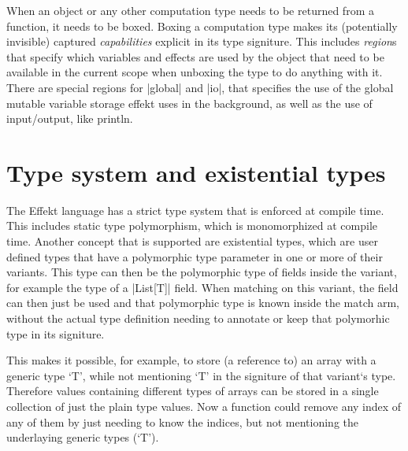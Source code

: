 When an object or any other computation type needs to be returned from a function, it needs to be boxed. Boxing a computation type makes its (potentially invisible) captured \textit{capabilities} explicit in its type signiture. This includes \textit{region}s that specify which variables and effects are used by the object that need to be available in the current scope when unboxing the type to do anything with it. There are special regions for |global| and |io|, that specifies the use of the global mutable variable storage effekt uses in the background, as well as the use of input/output, like println.

\section{Type system and existential types}

The Effekt language has a strict type system that is enforced at compile time. This includes static type polymorphism, which is monomorphized at compile time. Another concept that is supported are existential types, which are user defined types that have a polymorphic type parameter in one or more of their variants. This type can then be the polymorphic type of fields inside the variant, for example the type of a |List[T]| field. When matching on this variant, the field can then just be used and that polymorphic type is known inside the match arm, without the actual type definition needing to annotate or keep that polymorhic type in its signiture.

This makes it possible, for example, to store (a reference to) an array with a generic type `T', while not mentioning `T' in the signiture of that variant`s type. Therefore values containing different types of arrays can be stored in a single collection of just the plain type values. Now a function could remove any index of any of them by just needing to know the indices, but not mentioning the underlaying generic types (`T').
